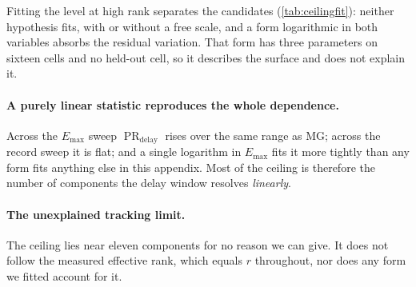 \documentclass[twoside]{article}
\DeclareMathOperator{\PR}{PR}
\begin{document}
Fitting the level at high rank separates the candidates (\cref{tab:ceilingfit}): neither
hypothesis fits, with or without a free scale, and a form logarithmic in both variables absorbs
the residual variation. That form has three parameters on sixteen cells and no held-out cell, so it
describes the surface and does not explain it.

\begin{table}[H]
\centering
\caption{Neither candidate explanation of the ceiling accounts for the measured level.
Each form scored at $r \ge 16$ over the sixteen measured $(E_{\max}, N)$ cells, in sample: no cell
is held out, so the error falls with the parameter count by construction. The spread of the fitted
quantity itself is $2.00$ components.}
\label{tab:ceilingfit}
\end{table}

\paragraph{A purely linear statistic reproduces the whole dependence.} Across the $E_{\max}$ sweep
$\PR_{\mathrm{delay}}$ rises over the same range as MG; across the record sweep it is flat; and a
single logarithm in $E_{\max}$ fits it more tightly than any form fits anything else in this
appendix. Most of the ceiling is therefore the number of components the delay window resolves
\emph{linearly}.

\paragraph{The unexplained tracking limit.} The ceiling lies near eleven components for no reason
we can give. It does not follow the measured effective rank, which equals $r$ throughout, nor does
any form we fitted account for it.
\end{document}
